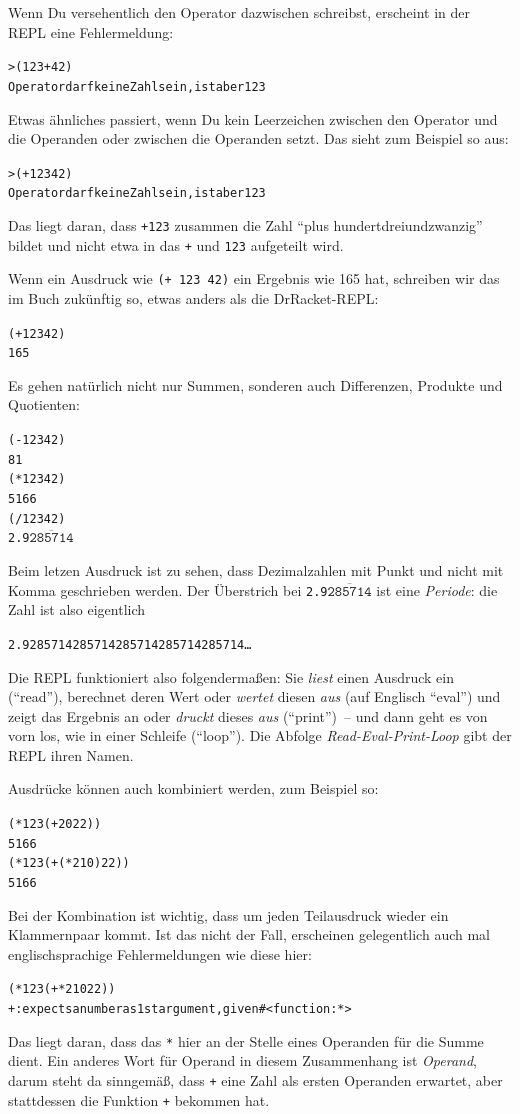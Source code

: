 Wenn Du versehentlich den Operator dazwischen schreibst, erscheint
in der REPL eine Fehlermeldung:
%
\begin{alltt}
> ({\color{green}123} + {\color{green}42})
{\color{red}Operator darf keine Zahl sein, ist aber 123}
\end{alltt}
%
Etwas ähnliches passiert, wenn Du kein Leerzeichen zwischen den
Operator und die Operanden oder zwischen die Operanden setzt.  Das
sieht zum Beispiel so aus:
%
\begin{alltt}
> ({\color{green}+123} {\color{green}42})
{\color{red}Operator darf keine Zahl sein, ist aber 123}
\end{alltt}
%
Das liegt daran, dass \texttt{+123} zusammen die Zahl "`plus
hundertdreiundzwanzig"' bildet und nicht etwa in das \texttt{+} und
\texttt{123} aufgeteilt wird.

Wenn ein Ausdruck wie \texttt{(+ 123 42)} ein Ergebnis wie 165 hat,
schreiben wir das im Buch zukünftig so, etwas anders als die
DrRacket-REPL:
%
\begin{alltt}
(+ 123 42)
\evalsto{} 165
\end{alltt}
%
Es gehen natürlich nicht nur Summen, sonderen auch Differenzen,
Produkte und Quotienten:
%
\begin{alltt}
(- 123 42)
\evalsto{} 81
(* 123 42)
\evalsto{} 5166
(/ 123 42)
2.9\(\overline{\mathtt{285714}}\)
\end{alltt}
%
Beim letzen Ausdruck ist zu sehen, dass Dezimalzahlen mit Punkt und
nicht mit Komma geschrieben werden.  Der Überstrich bei
\texttt{2.9\(\overline{\mathtt{285714}}\)} ist eine
\textit{Periode}: die Zahl ist also eigentlich
%
\begin{alltt}
2.9285714285714285714285714285714\ldots
\end{alltt}
%
Die REPL funktioniert also folgendermaßen: Sie \emph{liest} einen
Ausdruck ein ("`read"'), berechnet deren Wert oder \emph{wertet}
diesen \emph{aus} (auf Englisch "`eval"') und zeigt das Ergebnis an
oder \emph{druckt} dieses \emph{aus} ("`print"')~-- und dann geht es
von vorn los, wie in einer Schleife ("`loop"').  Die Abfolge
\emph{Read-Eval-Print-Loop} gibt der REPL ihren Namen.

Ausdrücke können auch kombiniert werden, zum Beispiel so:
%
\begin{alltt}
(* 123 (+ 20 22))
\evalsto{} 5166
(* 123 (+ (* 2 10) 22))
\evalsto{} 5166
\end{alltt}
%
Bei der Kombination ist wichtig, dass um jeden Teilausdruck wieder ein
Klammernpaar kommt.  Ist das nicht der Fall, erscheinen gelegentlich
auch mal englischsprachige Fehlermeldungen wie diese hier:
%
\begin{alltt}
(* 123 (+ * 2 10 22))
{\color{red}+: expects a number as 1st argument, given #<function:*>}
\end{alltt}
%
Das liegt daran, dass das \texttt{*} hier an der Stelle eines
Operanden für die Summe dient.  Ein anderes Wort für Operand in diesem
Zusammenhang ist \textit{Operand}, darum steht da sinngemäß, dass
\texttt{+} eine Zahl als ersten Operanden erwartet, aber
stattdessen die Funktion \texttt{+} bekommen hat.


